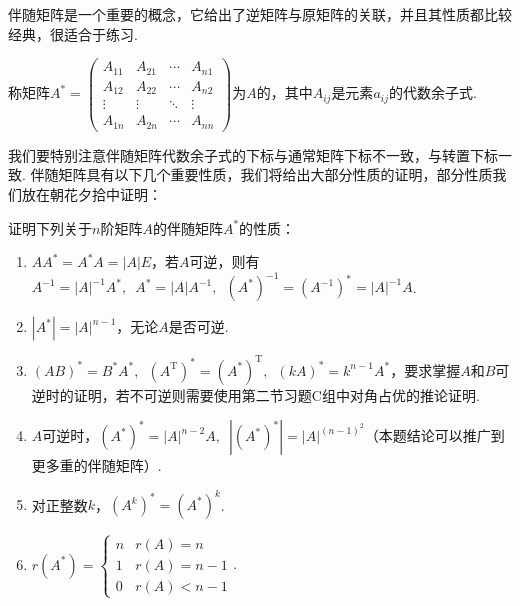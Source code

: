 伴随矩阵是一个重要的概念，它给出了逆矩阵与原矩阵的关联，并且其性质都比较经典，很适合于练习.
\begin{definition}[伴随矩阵] 
    称矩阵$A^*=\begin{pmatrix}
            A_{11} & A_{21} & \cdots & A_{n1} \\
            A_{12} & A_{22} & \cdots & A_{n2} \\
            \vdots & \vdots & \ddots & \vdots \\
            A_{1n} & A_{2n} & \cdots & A_{nn}
        \end{pmatrix}$为$A$的，其中$A_{ij}$是元素$a_{ij}$的代数余子式.
\end{definition}
我们要特别注意伴随矩阵代数余子式的下标与通常矩阵下标不一致，与转置下标一致. 伴随矩阵具有以下几个重要性质，我们将给出大部分性质的证明，部分性质我们放在朝花夕拾中证明：
\begin{example} \label{ex:13:伴随矩阵}
    证明下列关于$n$阶矩阵$A$的伴随矩阵$A^*$的性质：
    \begin{enumerate}
        \item \label{item:13:伴随矩阵:1}
              $AA^*=A^*A=|A|E$，若$A$可逆，则有$A^{-1}=|A|^{-1}A^*,\enspace A^*=|A|A^{-1},\enspace (A^*)^{-1}=(A^{-1})^*=|A|^{-1}A$.

        \item $|A^*|=|A|^{n-1}$，无论$A$是否可逆.

        \item \label{item:13:伴随矩阵:3}
              $(AB)^*=B^*A^*,\enspace (A^\mathrm{T})^*=(A^*)^\mathrm{T},\enspace (kA)^*=k^{n-1}A^*$，要求掌握$A$和$B$可逆时的证明，若不可逆则需要使用第二节习题C组中对角占优的推论证明.

        \item $A$可逆时，$(A^*)^*=|A|^{n-2}A,\enspace |(A^*)^*|=|A|^{(n-1)^2}$（本题结论可以推广到更多重的伴随矩阵）.

        \item 对正整数$k$，$(A^k)^*=(A^*)^k$.

        \item $r(A^*)=\begin{cases}
                      n & r(A)=n     \\
                      1 & r(A)=n-1   \\
                      0 & r(A) < n-1
                  \end{cases}$.
    \end{enumerate}
\end{example}

